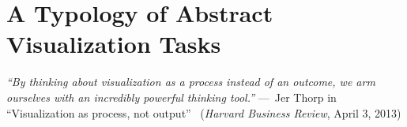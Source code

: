 
\chapter{A Typology of Abstract Visualization Tasks}
\label{ch:typology}


\begin{epigraph}
    \item \emph{``By thinking about visualization as a process instead of an outcome, we arm ourselves with an incredibly powerful thinking tool.''} ---~Jer Thorp in ``Visualization as process, not output''~\cite{Thorp2013} (\emph {Harvard Business Review}, April 3, 2013)
\end{epigraph}

